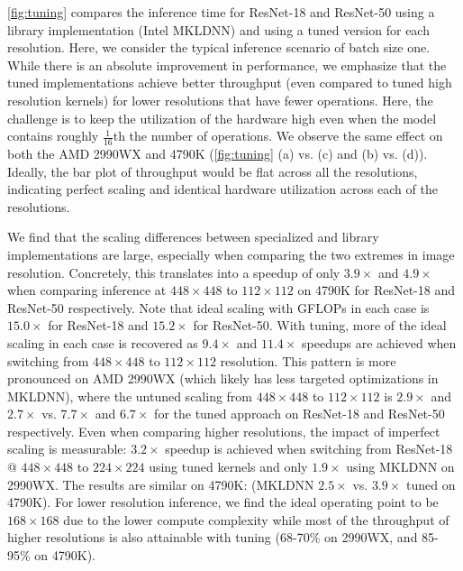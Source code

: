 \autoref{fig:tuning} compares the inference time for ResNet-18 and ResNet-50 using a library implementation (Intel MKLDNN) and using a tuned version for each resolution.
Here, we consider the typical inference scenario of batch size one.
While there is an absolute improvement in performance, we emphasize that the tuned implementations achieve better throughput (even compared to tuned high resolution kernels) for lower resolutions that have fewer operations.
Here, the challenge is to keep the utilization of the hardware high even when the model contains roughly $\frac{1}{16}$th the number of operations.
We observe the same effect on both the AMD 2990WX and 4790K (\autoref{fig:tuning} (a) vs. (c) and (b) vs. (d)).
Ideally, the bar plot of throughput would be flat across all the resolutions, indicating perfect scaling and identical hardware utilization across each of the resolutions.

We find that the scaling differences between specialized and library implementations are large, especially when comparing the two extremes in image resolution.
Concretely, this translates into a speedup of only $3.9\times$ and $4.9\times$ when comparing inference at $448\times448$ to $112\times112$ on 4790K for ResNet-18 and ResNet-50 respectively.
Note that ideal scaling with GFLOPs in each case is $15.0\times$ for ResNet-18 and $15.2\times$ for ResNet-50.
With tuning, more of the ideal scaling in each case is recovered
as $9.4\times$ and $11.4\times$ speedups are achieved when switching from $448\times448$ to $112\times112$ resolution.
This pattern is more pronounced on AMD 2990WX (which likely has less targeted optimizations in MKLDNN), where the untuned scaling from $448\times448$ to $112\times112$ is $2.9\times$ and $2.7\times$ vs. $7.7\times$ and $6.7\times$ for the tuned approach on ResNet-18 and ResNet-50 respectively.
Even when comparing higher resolutions, the impact of imperfect scaling is measurable: $3.2\times$ speedup is achieved when switching from ResNet-18 @ $448\times448$ to $224\times224$ using tuned kernels and only $1.9\times$ using MKLDNN on 2990WX.
The results are similar on 4790K: (MKLDNN $2.5\times$ vs. $3.9\times$ tuned on 4790K).
For lower resolution inference, we find the ideal operating point to be $168\times168$ due to the lower compute complexity while most of the throughput of higher resolutions is also attainable with tuning (68-70\% on 2990WX, and 85-95\% on 4790K). 

